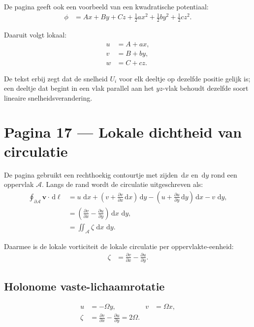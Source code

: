 \documentclass[11pt]{article}
\newcommand{\dd}{\,\mathrm{d}}
\newcommand{\vect}[1]{\mathbf{#1}}
\begin{document}
De pagina geeft ook een voorbeeld van een kwadratische potentiaal:
\begin{align*}
\phi
  &=
  Ax+By+Cz
  +\frac{1}{2}ax^2
  +\frac{1}{2}by^2
  +\frac{1}{2}cz^2.
\end{align*}

Daaruit volgt lokaal:
\begin{align*}
u &= A+ax,\\
v &= B+by,\\
w &= C+cz.
\end{align*}

De tekst erbij zegt dat de snelheid $U_i$ voor elk deeltje op dezelfde positie gelijk is; een deeltje dat begint in een vlak parallel aan het $yz$-vlak behoudt dezelfde soort lineaire snelheidsverandering.

\section*{Pagina 17 --- Lokale dichtheid van circulatie}

De pagina gebruikt een rechthoekig contourtje met zijden $\dd x$ en $\dd y$ rond een oppervlak $\mathcal{A}$. Langs de rand wordt de circulatie uitgeschreven als:
\begin{align*}
\oint_{\partial\mathcal{A}}\vect{v}\cdot\dd\vect{\ell}
  &=
  u\,\dd x
  +\left(
    v+\frac{\partial v}{\partial x}\dd x
  \right)\dd y
  -\left(
    u+\frac{\partial u}{\partial y}\dd y
  \right)\dd x
  -v\,\dd y,
\\
  &=
  \left(
  \frac{\partial v}{\partial x}
  -
  \frac{\partial u}{\partial y}
  \right)
  \dd x\,\dd y,
\\
  &=
  \iint_{\mathcal{A}}\zeta\,\dd x\,\dd y.
\end{align*}

Daarmee is de lokale vorticiteit de lokale circulatie per oppervlakte-eenheid:
\begin{align*}
\zeta
  &=
  \frac{\partial v}{\partial x}
  -
  \frac{\partial u}{\partial y}.
\end{align*}

\subsection*{Holonome vaste-lichaamrotatie}

\begin{align*}
u
  &=
  -\Omega y,
&
v
  &=
  \Omega x,
\\
\zeta
  &=
  \frac{\partial v}{\partial x}
  -
  \frac{\partial u}{\partial y}
   =
  2\Omega.
\end{align*}
\end{document}
